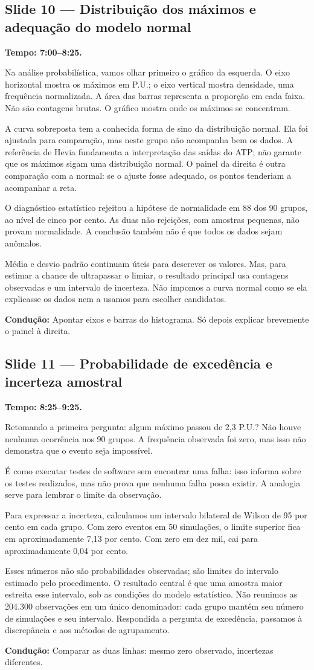 \documentclass[11pt,a4paper]{article}
\newcommand{\slide}[3]{\Needspace{8\baselineskip}
  \subsection*{Slide #1 --- #2}
  \textbf{Tempo: #3.}\par}
\newcommand{\cue}[1]{\par{\small\color{accent}\textbf{Condução:} #1}\par}
\begin{document}
\slide{10}{Distribuição dos máximos e adequação do modelo normal}{7:00--8:25}
Na análise probabilística, vamos olhar primeiro o gráfico da esquerda. O eixo horizontal mostra os
máximos em P.U.; o eixo vertical mostra densidade, uma frequência
normalizada. A área das barras representa a proporção em cada faixa.
Não são contagens brutas. O gráfico mostra onde os máximos se concentram.

A curva sobreposta tem a conhecida forma de sino da distribuição normal.
Ela foi ajustada para comparação, mas neste grupo não acompanha bem
os dados. A referência de Hevia fundamenta a interpretação das saídas
do ATP; não garante que os máximos sigam uma distribuição normal. O painel da direita é outra comparação com a normal:
se o ajuste fosse adequado, os pontos tenderiam a acompanhar a reta.

O diagnóstico estatístico rejeitou a hipótese de normalidade em 88 dos
90 grupos, ao nível de cinco por cento. As duas não rejeições, com
amostras pequenas, não provam normalidade. A conclusão também não é
que todos os dados sejam anômalos.

Média e desvio padrão continuam úteis para descrever os valores. Mas,
para estimar a chance de ultrapassar o limiar, o resultado principal usa
contagens observadas e um intervalo de incerteza. Não impomos a curva
normal como se ela explicasse os dados nem a usamos para escolher
candidatos.
\cue{Apontar eixos e barras do histograma. Só depois explicar brevemente o painel à direita.}


\slide{11}{Probabilidade de excedência e incerteza amostral}{8:25--9:25}
Retomando a primeira pergunta: algum máximo passou de 2,3 P.U.?
Não houve nenhuma ocorrência nos 90 grupos. A frequência observada foi
zero, mas isso não demonstra que o evento seja impossível.

É como executar testes de software sem encontrar uma falha: isso informa
sobre os testes realizados, mas não prova que nenhuma falha possa existir.
A analogia serve para lembrar o limite da observação.

Para expressar a incerteza, calculamos um intervalo bilateral de Wilson de
95 por cento em cada grupo. Com zero eventos em 50 simulações, o limite
superior fica em aproximadamente 7,13 por cento. Com zero em dez mil,
cai para aproximadamente 0,04 por cento.

Esses números não são probabilidades observadas; são limites do intervalo
estimado pelo procedimento. O resultado central é que uma amostra maior
estreita esse intervalo, sob as condições do modelo estatístico.
Não reunimos as 204.300 observações em um único denominador: cada grupo
mantém seu número de simulações e seu intervalo. Respondida a pergunta de excedência, passamos à discrepância e aos métodos de agrupamento.
\cue{Comparar as duas linhas: mesmo zero observado, incertezas diferentes.}
\end{document}
